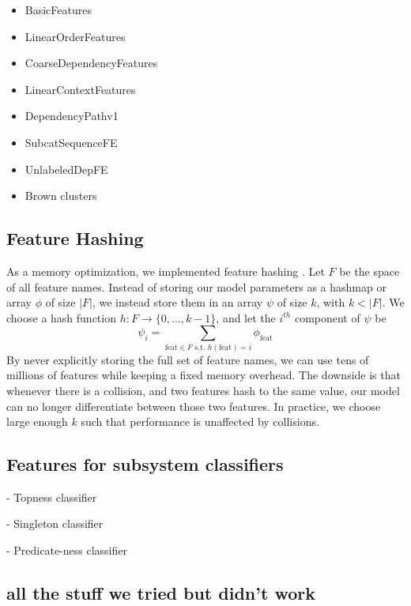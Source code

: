 \documentclass[11pt]{article}
\begin{document}
\label{s:features}

\begin{itemize}
\item BasicFeatures
\item LinearOrderFeatures
\item CoarseDependencyFeatures
\item LinearContextFeatures
\item DependencyPathv1
\item SubcatSequenceFE
\item UnlabeledDepFE
\item Brown clusters
\end{itemize}



\subsection{Feature Hashing}

As a memory optimization, we implemented feature hashing
\cite{weinberger_feature_2009}.
Let $F$ be the space of all feature names.
Instead of storing our model parameters as a hashmap %
or array $\phi$ of size $|F|$, we instead store them in an array $\psi$ of size
$k$, with $k < |F|$.
We choose a hash function $h : F \rightarrow \{0, \ldots, k-1\}$, and
let the $i^{th}$ component of $\psi$ be 
\[
\psi_i = \sum_{\text{feat}\in F \text{ s.t. }
h(\text{feat})=i}{\phi_{\text{feat}}}
\]
By never explicitly storing the full set of feature names, we can use
tens of millions of features while keeping a fixed memory overhead.
The downside is that whenever there is a collision, and two features hash to the
same value, our model can no longer differentiate between those two features.
In practice, we choose large enough $k$ such that performance is unaffected by
collisions.

\subsection{Features for subsystem classifiers}

 - Topness classifier

 - Singleton classifier

 - Predicate-ness classifier


\subsection{all the stuff we tried but didn't work}
\end{document}
